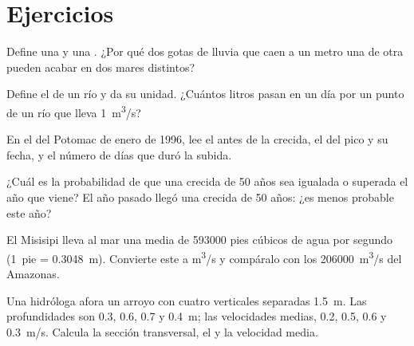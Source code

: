 \section{Ejercicios}

\begin{exercise}[$\star$]\label{exo:g10:drainage-basins:1}
Define una  y una . ¿Por qué dos gotas
de lluvia que caen a un metro una de otra pueden acabar en dos mares
distintos?
\end{exercise}

\begin{exercise}[$\star$]\label{exo:g10:drainage-basins:2}
Define el  de un río y da su unidad. ¿Cuántos litros pasan en un día
por un punto de un río que lleva \qty{1}{m^3/s}?
\end{exercise}

\begin{exercise}[$\star$]\label{exo:g10:drainage-basins:3}
En el  del Potomac de enero de 1996, lee el  antes de la
crecida, el  del pico y su fecha, y el número de días que duró la
subida.
\end{exercise}

\begin{exercise}[$\star$]\label{exo:g10:drainage-basins:4}
¿Cuál es la probabilidad de que una crecida de \num{50} años sea igualada o
superada el año que viene? El año pasado llegó una crecida de \num{50} años:
¿es menos probable este año?
\end{exercise}

\begin{exercise}[$\star$]\label{exo:g10:drainage-basins:5}
El Misisipi lleva al mar una media de \num{593000} pies cúbicos de agua por
segundo (\num{1}~pie = \qty{0.3048}{m}). Convierte este  a
\unit{m^3/s} y compáralo con los \qty{206000}{m^3/s} del Amazonas.
\end{exercise}

\begin{exercise}[$\star\star$]\label{exo:g10:drainage-basins:6}
Una hidróloga afora un arroyo con cuatro verticales separadas \qty{1.5}{m}.
Las profundidades son \num{0.3}, \num{0.6}, \num{0.7} y \qty{0.4}{m}; las
velocidades medias, \num{0.2}, \num{0.5}, \num{0.6} y \qty{0.3}{m/s}. Calcula
la sección transversal, el  y la velocidad media.
\end{exercise}

